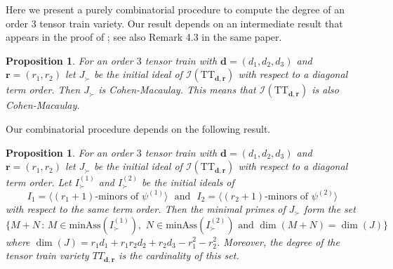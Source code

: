 \documentclass[12pt]{article}
\newtheorem{proposition}[theorem]{Proposition}
\theoremstyle{definition}
\numberwithin{theorem}{section}
\begin{document}
Here we present a purely combinatorial procedure to compute the degree of an order $3$ tensor train variety. Our result depends on an intermediate result that appears in the proof of \cite[Theorem 4.1]{FK20}; see also Remark 4.3 in the same paper. 
\begin{proposition} For an order $3$ tensor train with $\mathbf{d} = (d_1,d_2,d_3)$ and $\mathbf{r} = (r_1, r_2)$ let $J_\succ$ be the initial ideal 
of $\mathcal{I}(\mathrm{TT}_{\mathbf{d}, \mathbf{r}})$ with respect to a diagonal term order. Then $J_\succ$ is Cohen-Macaulay. This means that $\mathcal{I}(\mathrm{TT}_{\mathbf{d}, \mathbf{r}})$
is also Cohen-Macaulay.
\end{proposition}
Our combinatorial procedure depends on the following result. 
\begin{proposition} \label{prop:degree-of-order-3} For an order $3$ tensor train with $\mathbf{d} = (d_1,d_2,d_3)$ and $\mathbf{r} = (r_1, r_2)$ let $J_\succ$ be the initial ideal 
of $\mathcal{I}(\mathrm{TT}_{\mathbf{d}, \mathbf{r}})$ with respect to a diagonal term order. Let $I^{(1)}_\succ$ and $I^{(2)}_\succ$ be the initial ideals 
of 
$$I_1 = \langle (r_1+1)\text{-minors of } \psi^{(1)}\rangle \, \, \mbox{   and   }  \,\,I_2 = \langle (r_2+1)\text{-minors of } \psi^{(2)}\rangle$$
with respect to the same term order. 
Then the minimal primes of $J_\succ$ 
form the set
$$ \{ M+N \, : \, M \in \mathrm{minAss}(I^{(1)}_\succ), \,\, 
N \in \mathrm{minAss}(I^{(2)}_\succ) \mbox{  and } \dim(M+N) = \dim(J)  \}
$$
where $\dim(J) = r_1d_1 + r_1r_2d_2 + r_2d_3 -r_1^2-r_2^2$.
Moreover, the degree of the tensor train variety $TT_{\mathbf{d}, \mathbf{r}}$ is the cardinality of this set.  
\end{proposition}
\end{document}
